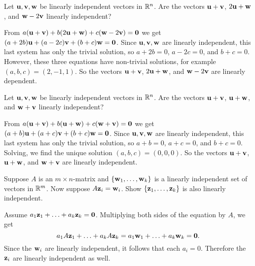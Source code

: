 \begin{ex}
  Let $\vect{u},\vect{v},\vect{w}$ be linearly independent vectors in
  $\mathbb{R}^n$. Are the vectors $\vect{u}+\vect{v}$, $2\vect{u}+\vect{w}$,
  and $\vect{w}-2\vect{v}$ linearly independent?
  \begin{sol}
    From
    $a(\vect{u}+\vect{v}) + b(2\vect{u}+\vect{w}) +
    c(\vect{w}-2\vect{v})=\vect{0}$ we get
    $(a+2b)\vect{u} + (a-2c)\vect{v} + (b+c)\vect{w}=\vect{0}$.  Since
    $\vect{u},\vect{v},\vect{w}$ are linearly independent, this last
    system has only the trivial solution, so $a+2b=0$, $a-2c=0$, and
    $b+c=0$. However, these three equations have non-trivial
    solutions, for example $(a,b,c)=(2,-1,1)$. So the vectors
    $\vect{u}+\vect{v}$, $2\vect{u}+\vect{w}$, and
    $\vect{w}-2\vect{v}$ are linearly dependent.
  \end{sol}
\end{ex}

\begin{ex}
  Let $\vect{u},\vect{v},\vect{w}$ be linearly independent vectors in
  $\mathbb{R}^n$. Are the vectors $\vect{u}+\vect{v}$, $\vect{u}+\vect{w}$,
  and $\vect{w}+\vect{v}$ linearly independent?
  \begin{sol}
    From
    $a(\vect{u}+\vect{v}) + b(\vect{u}+\vect{w}) +
    c(\vect{w}+\vect{v})=\vect{0}$ we get
    $(a+b)\vect{u} + (a+c)\vect{v} + (b+c)\vect{w}=\vect{0}$.  Since
    $\vect{u},\vect{v},\vect{w}$ are linearly independent, this last
    system has only the trivial solution, so $a+b=0$, $a+c=0$, and
    $b+c=0$. Solving, we find the unique solution
    $(a,b,c)=(0,0,0)$. So the vectors $\vect{u}+\vect{v}$,
    $\vect{u}+\vect{w}$, and $\vect{w}+\vect{v}$ are linearly
    independent.
  \end{sol}
\end{ex}

\begin{ex}
  Suppose $A$ is an $m\times n$-matrix and
  $\set{\vect{w}_1,\ldots,\vect{w}_k}$ is a linearly independent
  set of vectors in $\mathbb{R}^m$. Now suppose
  $A\vect{z}_i=\vect{w}_i$. Show
  $\set{\vect{z}_1,\ldots,\vect{z}_k}$ is also linearly
  independent.
  \begin{sol}
    Assume
    $a_1\vect{z}_1+\ldots+a_k\vect{z}_k=\vect{0}$. Multiplying
    both sides of the equation by $A$, we get
    \begin{equation*}
      a_1A\vect{z}_1+\ldots+a_kA\vect{z}_k=
      a_1\vect{w}_1+\ldots+a_k\vect{w}_k=\vect{0}.
    \end{equation*}
    Since the $\vect{w}_i$ are linearly independent, it follows that
    each $a_i=0$. Therefore the $\vect{z}_i$ are linearly
    independent as well.
  \end{sol}
\end{ex}

